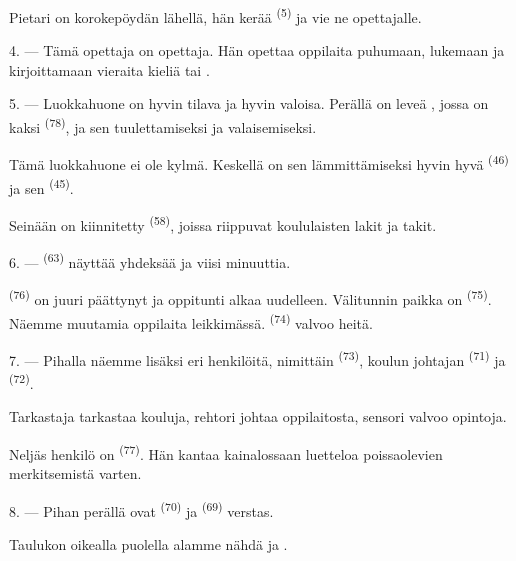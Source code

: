 Pietari on korokepöydän lähellä, hän kerää 
\textsuperscript{(5)} ja vie ne opettajalle.

4. --- Tämä opettaja on  opettaja. Hän opettaa oppilaita
puhumaan, lukemaan ja kirjoittamaan vieraita kieliä  tai .

5. --- Luokkahuone on hyvin tilava ja hyvin valoisa. Perällä on leveä
, jossa on kaksi  \textsuperscript{(78)}, ja
 sen tuulettamiseksi ja valaisemiseksi.

Tämä luokkahuone ei ole kylmä. Keskellä on sen lämmittämiseksi hyvin hyvä
 \textsuperscript{(46)} ja sen 
\textsuperscript{(45)}.

Seinään on kiinnitetty  \textsuperscript{(58)}, joissa
riippuvat koululaisten lakit ja takit.

\VUsaut{5.2mm}
\VUsaut{3.6mm}

6. ---  \textsuperscript{(63)} näyttää yhdeksää ja viisi
minuuttia.

 \textsuperscript{(76)} on juuri päättynyt ja oppitunti alkaa
uudelleen. Välitunnin paikka on  \textsuperscript{(75)}.
Näemme muutamia oppilaita leikkimässä. 
\textsuperscript{(74)} valvoo heitä.

7. --- Pihalla näemme lisäksi eri henkilöitä, nimittäin 
\textsuperscript{(73)}, koulun johtajan 
\textsuperscript{(71)} ja  \textsuperscript{(72)}.

Tarkastaja tarkastaa kouluja, rehtori johtaa oppilaitosta, sensori valvoo
opintoja.

Neljäs henkilö on  \textsuperscript{(77)}. Hän kantaa
kainalossaan luetteloa poissaolevien merkitsemistä varten.

8. --- Pihan perällä ovat  \textsuperscript{(70)} ja
 \textsuperscript{(69)} verstas.

Taulukon oikealla puolella alamme nähdä  ja
 .


